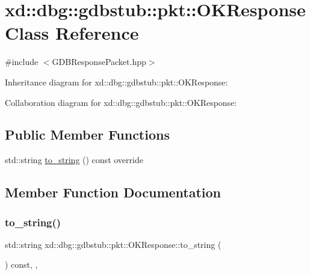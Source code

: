 \hypertarget{classxd_1_1dbg_1_1gdbstub_1_1pkt_1_1_o_k_response}{}\section{xd\+:\+:dbg\+:\+:gdbstub\+:\+:pkt\+:\+:O\+K\+Response Class Reference}
\label{classxd_1_1dbg_1_1gdbstub_1_1pkt_1_1_o_k_response}


{\ttfamily \#include $<$G\+D\+B\+Response\+Packet.\+hpp$>$}



Inheritance diagram for xd\+:\+:dbg\+:\+:gdbstub\+:\+:pkt\+:\+:O\+K\+Response\+:


Collaboration diagram for xd\+:\+:dbg\+:\+:gdbstub\+:\+:pkt\+:\+:O\+K\+Response\+:
\subsection*{Public Member Functions}
\begin{DoxyCompactItemize}
\item 
std\+::string \mbox{\hyperlink{classxd_1_1dbg_1_1gdbstub_1_1pkt_1_1_o_k_response_a12f9f11a40f54ab5ade92ba524894d65}{to\+\_\+string}} () const override
\end{DoxyCompactItemize}


\subsection{Member Function Documentation}
\mbox{\label{classxd_1_1dbg_1_1gdbstub_1_1pkt_1_1_o_k_response_a12f9f11a40f54ab5ade92ba524894d65}} 
\subsubsection{\texorpdfstring{to\+\_\+string()}{to\_string()}}
{\footnotesize\ttfamily std\+::string xd\+::dbg\+::gdbstub\+::pkt\+::\+O\+K\+Response\+::to\+\_\+string (\begin{DoxyParamCaption}{ }\end{DoxyParamCaption}) const\hspace{0.3cm}{\ttfamily [inline]}, {\ttfamily [override]}, {\ttfamily [virtual]}}



